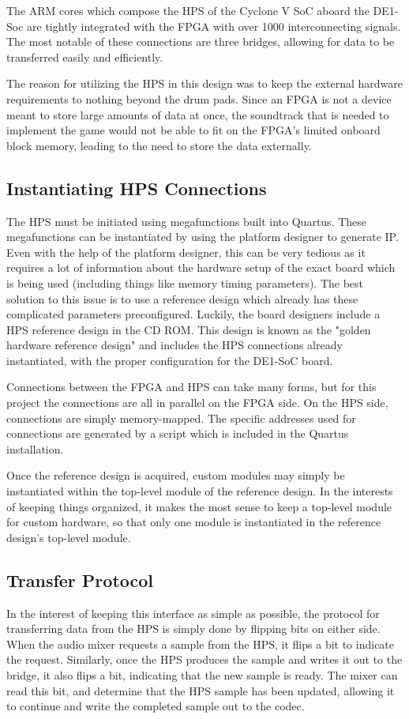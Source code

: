 \documentclass{subfile}
\begin{document}
  The ARM cores which compose the HPS of the Cyclone V SoC aboard the 
  DE1-Soc
  are tightly integrated with the FPGA with over 1000 interconnecting signals. %
  The most notable of these connections are three bridges, allowing for data to be transferred 
  easily and efficiently.

  The reason for utilizing the HPS in this design was to keep the external hardware requirements 
  to nothing beyond the drum pads. 
  Since an FPGA is not a device meant to store large amounts of data at once, the soundtrack that 
  is needed to implement the game would not be able to fit on the 
  FPGA's limited onboard block memory, leading to the need to store the data externally.

  \subsection{Instantiating HPS Connections}
  The HPS must be initiated using megafunctions built into Quartus. 
  These megafunctions can be instantiated by using the platform designer to generate IP.
  Even with the help of the platform designer, this can be very tedious as it requires a lot of 
  information about the hardware setup of the exact board which is being used (including things like memory timing parameters).
  The best solution to this issue is to use a reference design which already has 
  these complicated parameters 
  preconfigured. 
  Luckily, the board designers include a HPS reference design in the CD ROM. 
  This design is known as the "golden hardware reference design" and includes the HPS connections 
  already instantiated, with the proper configuration for the DE1-SoC board.

  Connections between the FPGA and HPS can take many forms, but for this project the connections 
  are all in parallel on the FPGA side. 
  On the HPS side, connections are simply memory-mapped. 
  The specific addresses used for connections are generated by a script which is included in 
  the Quartus installation.

  Once the reference design is acquired, custom modules may simply be instantiated within the 
  top-level module of the reference design. 
  In the interests of keeping things organized, it makes the most sense to keep a top-level 
  module for custom hardware, so that only one module is instantiated in the reference 
  design's top-level module.

  \subsection{Transfer Protocol} 
  In the interest of keeping this interface as simple as possible, the protocol for transferring 
  data from the HPS is simply done by flipping bits on either side.
  When the audio mixer requests a sample from the HPS, it flips a bit to indicate the request.
  Similarly, once the HPS produces the sample and writes it out to the bridge,
  it also flips a bit, indicating that the new sample is ready. 
  The mixer can read this bit, and determine that the HPS sample has been updated, 
  allowing it to continue and write the completed sample out to the codec.
\end{document}

